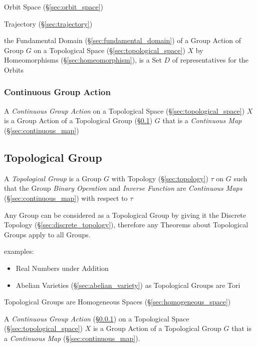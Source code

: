 \fist Orbit Space (\S\ref{sec:orbit_space})

\fist Trajectory (\S\ref{sec:trajectory})

the Fundamental Domain (\S\ref{sec:fundamental_domain}) of a Group Action of
Group $G$ on a Topological Space (\S\ref{sec:topological_space}) $X$ by
Homeomorphisms (\S\ref{sec:homeomorphism}), is a Set $D$ of representatives for
the Orbits



\subsubsection{Continuous Group Action}\label{sec:continuous_group_action}

A \emph{Continuous Group Action} on a Topological Space
(\S\ref{sec:topological_space}) $X$ is a Group Action of a Topological Group
(\S\ref{sec:topological_group}) $G$ that is a \emph{Continuous Map}
(\S\ref{sec:continuous_map})



\subsection{Topological Group}\label{sec:topological_group}

A \emph{Topological Group} is a Group $G$ with Topology (\S\ref{sec:topology})
$\tau$ on $G$ such that the Group \emph{Binary Operation} and \emph{Inverse
  Function} are \emph{Continuous Maps} (\S\ref{sec:continuous_map})
with respect to $\tau$

Any Group can be considered as a Topological Group by giving it the Discrete
Topology (\S\ref{sec:discrete_topology}), therefore any Theorems about
Topological Groups apply to all Groups.

examples:
\begin{itemize}
  \item Real Numbers under Addition
  \item Abelian Varieties (\S\ref{sec:abelian_variety}) as Topological Groups
    are Tori %
\end{itemize}

Topological Groups are Homogeneous Spaces (\S\ref{sec:homogeneous_space})

A \emph{Continuous Group Action} (\S\ref{sec:continuous_group_action}) on a
Topological Space (\S\ref{sec:topological_space}) $X$ is a Group Action of a
Topological Group $G$ that is a \emph{Continuous Map}
(\S\ref{sec:continuous_map}).



